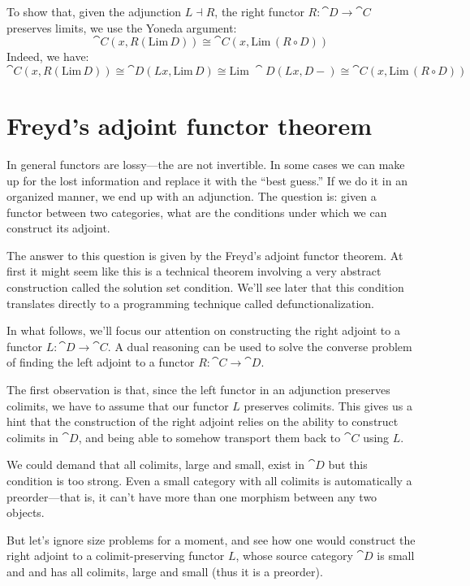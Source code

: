 \documentclass[DaoFP]{subfiles}
\begin{document}
To show that, given the adjunction $L \dashv R$, the right functor $R \colon \cat D \to \cat C$ preserves limits, we use the Yoneda argument:
\[ \cat C(x, R (\text{Lim}\, D)) \cong \cat C (x, \text{Lim}\, (R \circ D)) \]
Indeed, we have:
\[ \cat C(x, R (\text{Lim}\, D)) \cong \cat D(L x, \text{Lim}\, D) \cong \text{Lim}\; \cat D(L x, D-) \cong \cat C(x, \text{Lim}\, (R \circ D))\]


\section{Freyd's adjoint functor theorem}

In general functors are lossy---the are not invertible. In some cases we can make up for the lost information and replace it with the ``best guess.'' If we do it in an organized manner, we end up with an adjunction. The question is: given a functor between two categories, what are the conditions under which we can construct its adjoint. 

The answer to this question is given by the Freyd's adjoint functor theorem. At first it might seem like this is a technical theorem involving a very abstract construction called the solution set condition. We'll see later that this condition translates directly to a programming technique called defunctionalization. 

In what follows, we'll focus our attention on constructing the right adjoint to a functor $L \colon \cat D \to \cat C$. A dual reasoning can be used to solve the converse problem of finding the left adjoint to a functor $R \colon \cat C \to \cat D$.

The first observation is that, since the left functor in an adjunction preserves colimits, we have to assume that our functor $L$  preserves colimits. This gives us a hint that the construction of the right adjoint relies on the ability to construct colimits in $\cat D$, and being able to somehow transport them back to $\cat C$ using $L$. 

We could demand that all colimits, large and small, exist in $\cat D$ but this condition is too strong. Even a small category with all colimits is automatically a preorder---that is, it can't have more than one morphism between any two objects. 

But let's ignore size problems for a moment, and see how one would construct the right adjoint to a colimit-preserving functor $L$, whose source category $\cat D$ is small and and has all colimits, large and small (thus it is a preorder).
\end{document}
